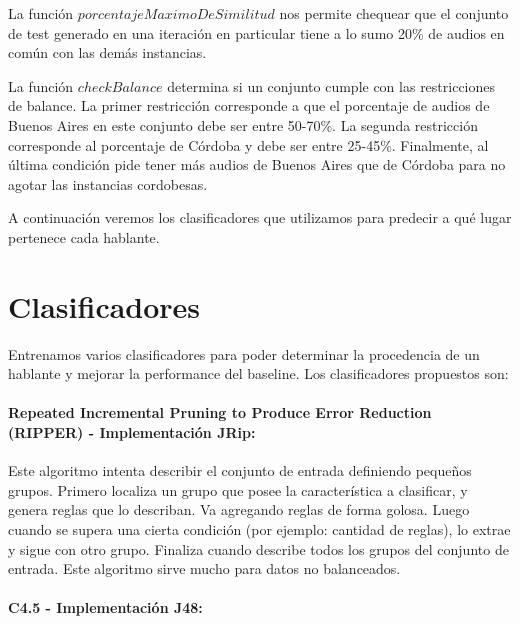 La función $porcentajeMaximoDeSimilitud$ nos permite chequear que el conjunto de test generado en una iteración en particular tiene a lo sumo 20\% de audios en común con las demás instancias.

La función $checkBalance$ determina si un conjunto cumple con las restricciones de balance. La primer restricción corresponde a que el porcentaje de audios de Buenos Aires en este conjunto debe ser entre 50-70\%. La segunda restricción corresponde al porcentaje de Córdoba y debe ser entre 25-45\%. Finalmente, al última condición pide tener más audios de Buenos Aires que de Córdoba para no agotar las instancias cordobesas.

A continuación veremos los clasificadores que utilizamos para predecir a qué lugar pertenece cada hablante.

\section{Clasificadores}

Entrenamos varios clasificadores para poder determinar la procedencia de un hablante y mejorar la performance del baseline. Los clasificadores propuestos son: 

\paragraph{Repeated Incremental Pruning to Produce Error Reduction (RIPPER) \cite{Cohen1995} - Implementación JRip:}


Este algoritmo intenta describir el conjunto de entrada definiendo pequeños grupos. Primero localiza un grupo que posee la característica a clasificar, y genera reglas que lo describan. Va agregando reglas de forma golosa. Luego cuando se supera una cierta condición (por ejemplo: cantidad de reglas), lo extrae y sigue con otro grupo. Finaliza cuando describe todos los grupos del conjunto de entrada. Este algoritmo sirve mucho para datos no balanceados.

\paragraph{C4.5 \cite{Quinlan1993} - Implementación J48:}

